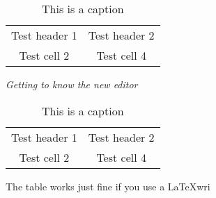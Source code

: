 \begin{table} 
    \begin{tabular}{ c c }
        Test header 1 & Test header 2 \\ 
        Test cell 2 & Test cell 4 \\ 
    \end{tabular} 
    \caption{This is a caption} 
\end{table}\textit{Getting to know the new editor}

\begin{table} 
    \begin{tabular}{ c c }
        Test header 1 & Test header 2 \\ 
        Test cell 2 & Test cell 4 \\ 
    \end{tabular} 
    \caption{This is a caption} 
\end{table}

The table works just fine if you use a \LaTeX wri

